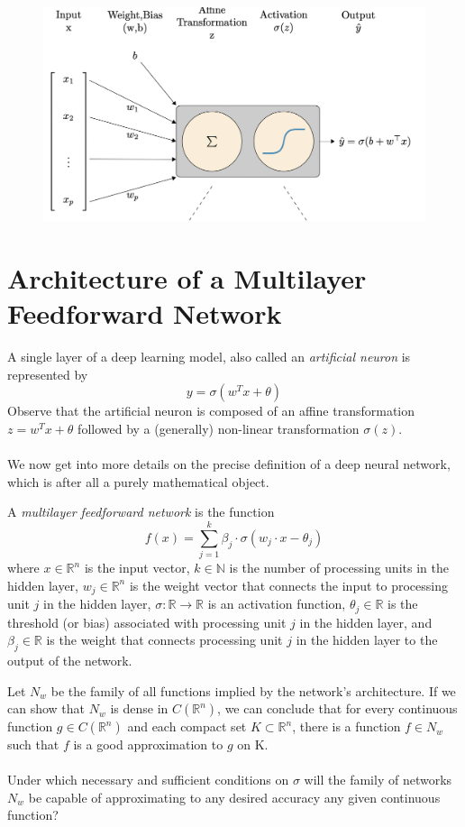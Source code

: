 \documentclass[../main.tex]{subfiles}
\begin{document}
	 \begin{figure}[h]
	 	\centering
	 	\includegraphics[width=0.6\linewidth]{imgs/neu}
	 \end{figure} \mbox{} \par
	 
	 
	 \section{Architecture of a Multilayer Feedforward Network}
	 
	 \noindent A single layer of a deep learning model, also called an\textit{ artificial neuron }is represented by $$ y=\sigma(w^Tx + \theta) $$
	 Observe that the artificial neuron is composed of an affine transformation $ z=w^Tx + \theta$ followed by a (generally) non-linear transformation $\sigma(z)$. \\ \\ 
	 \noindent  We now get into more details on the precise definition of a deep neural network, which is after all a purely mathematical object. 
	 \begin{definition} A \textit{multilayer feedforward network} is the function
	 	$$f(x)=\sum_{j=1}^k \beta_j \cdot \sigma(w_j \cdot x - \theta_j)$$
	 	where $x \in \mathbb{R}^n$ is the input vector, $k \in \mathbb{N}$ is the number of processing units in the hidden layer, $w_j \in \mathbb{R}^n$ is the weight vector that connects the input to processing unit $j$ in the hidden layer, $\sigma : \mathbb{R} \rightarrow \mathbb{R}$ is an activation function, $\theta_j \in \mathbb{R}$ is the threshold (or bias) associated with processing unit $j$ in the hidden layer, and $\beta_j \in \mathbb{R}$ is the weight that connects processing unit $j$ in the hidden layer to the output of the network.
	 	
	 	
	 \end{definition}
	 
	 \noindent Let $N_{w}$ be the family of all functions implied by the network's architecture.  If we can show that $N_{w}$ is dense in $C(\mathbb{R}^n)$, we can conclude that for every continuous function $g \in C(\mathbb{R}^n) $ and each compact set $K \subset \mathbb{R}^n$, there is a function $f \in N_{w}$ such that $f$ is a good approximation to $g$ on K. \\ \\
	 \noindent Under which necessary and sufficient conditions on $\sigma$ will the family of networks $N_w$ be capable of approximating to any desired accuracy any given continuous function?
	 
	
\end{document}

